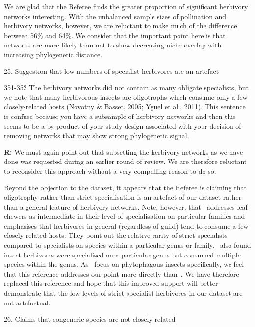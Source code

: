 \documentclass[12pt]{letter}
\newenvironment{refquote}{\bigskip \begin{it}}{\end{it}\smallskip}
\begin{document}
		We are glad that the Referee finds the greater proportion of significant herbivory networks interesting. With the unbalanced sample sizes of pollination and herbivory networks, however, we are reluctant to make much of the difference between 56\% and 64\%. We consider that the important point here is that networks are more likely than not to show decreasing niche overlap with increasing phylogenetic distance. 


	25. Suggestion that low numbers of specialist herbivores are an artefact


		\begin{refquote}
			351-352 The herbivory networks did not contain as many obligate specialists, but we note that many herbivorous insects are oligotrophs which consume only a few closely-related hosts (Novotny \& Basset, 2005; Yguel et al., 2011). This sentence is confuse because you have a subsample of herbivory networks and then this seems to be a by-product of your study design associated with your decision of removing networks that may show strong phylogenetic signal.
		\end{refquote}


		\textbf{R:} We must again point out that subsetting the herbivory networks as we have done was requested during an earlier round of review. We are therefore reluctant to reconsider this approach without a very compelling reason to do so. 


		Beyond the objection to the dataset, it appears that the Referee is claiming that oligotrophy rather than strict specialisation is an artefact of our dataset rather than a general feature of herbivory networks. Note, however, that~\citet{Novotny2005} addresses leaf-chewers as intermediate in their level of specialisation on particular families and emphasises that herbivores in general (regardless of guild) tend to consume a few closely-related hosts. They point out the relative rarity of strict specialists compared to specialists on species within a particular genus or family.~\citet{Brandle2006} also found insect herbivores were specialised on a particular genus but consumed multiple species within the genus. As~\citet{Brandle2006} focus on phytophagous insects specifically, we feel that this reference addresses our point more directly than~\citet{Yguel2011}. We have therefore replaced this reference and hope that this improved support will better demonstrate that the low levels of strict specialist herbivores in our dataset are not artefactual.


	26. Claims that congeneric species are not closely related 
\end{document}
